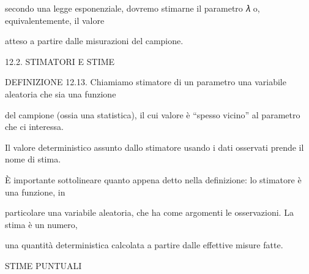 \documentclass[a4paper,portrait,12pt]{article}
\begin{document}
\begin{flushleft}
secondo una legge esponenziale, dovremo stimarne il parametro 𝜆 o, equivalentemente, il valore
\end{flushleft}


\begin{flushleft}
atteso a partire dalle misurazioni del campione.
\end{flushleft}





\begin{flushleft}
12.2. STIMATORI E STIME
\end{flushleft}


\begin{flushleft}
DEFINIZIONE 12.13. Chiamiamo stimatore di un parametro una variabile aleatoria che sia una funzione
\end{flushleft}


\begin{flushleft}
del campione (ossia una statistica), il cui valore \`{e} {``}spesso vicino'' al parametro che ci interessa.
\end{flushleft}


\begin{flushleft}
Il valore deterministico assunto dallo stimatore usando i dati osservati prende il nome di stima.
\end{flushleft}


\begin{flushleft}
\`{E} importante sottolineare quanto appena detto nella definizione: lo stimatore \`{e} una funzione, in
\end{flushleft}


\begin{flushleft}
particolare una variabile aleatoria, che ha come argomenti le osservazioni. La stima \`{e} un numero,
\end{flushleft}


\begin{flushleft}
una quantit\`{a} deterministica calcolata a partire dalle effettive misure fatte.
\end{flushleft}










\begin{flushleft}
STIME PUNTUALI
\end{flushleft}
\end{document}
